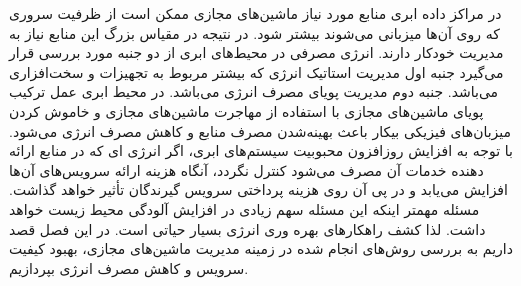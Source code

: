   در مراکز داده ابری منابع مورد نیاز ماشین‌های مجازی ممکن است از ظرفیت سروری که روی آن‌ها میزبانی می‌شوند بیشتر شود. در نتیجه در مقیاس بزرگ این منابع نیاز به مدیریت خودکار دارند. انرژی مصرفی در محیط‌های ابری از دو جنبه مورد بررسی قرار  می‌گیرد جنبه اول مدیریت استاتیک انرژی که بیشتر مربوط به تجهیزات و سخت‌افزاری می‌باشد. جنبه دوم مدیریت پویای مصرف انرژی می‌باشد. در محیط ابری عمل  ترکیب پویای ماشین‌های مجازی با استفاده از مهاجرت ماشین‌های مجازی و خاموش ­کردن میزبان‌های فیزیکی بیکار باعث 
 بهینه‌شدن  مصرف منابع و کاهش مصرف انرژی می­‌شود­. با توجه به افزایش روزافزون محبوبیت سیستم‌های ابری، اگر انرژی ای که در منابع ارائه دهنده خدمات آن مصرف می‌شود کنترل نگردد، آنگاه هزینه ارائه سرویس‌های آن‌ها  افزایش می‌یابد و در پی آن روی هزینه پرداختی سرویس گیرندگان تأثیر خواهد گذاشت. مسئله مهمتر اینکه این مسئله سهم زیادی در افزایش آلودگی محیط زیست خواهد داشت. لذا کشف راهکارهای بهره وری انرژی بسیار حیاتی است. در این فصل قصد داریم به بررسی روش‌های انجام شده در زمینه مدیریت ماشین‌های مجازی، بهبود کیفیت سرویس و کاهش مصرف انرژی بپردازیم.
 

